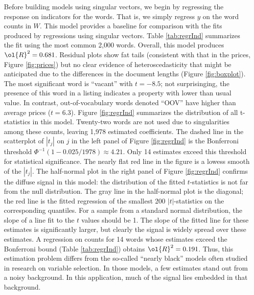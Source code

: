 \documentclass[12pt]{article}
\begin{document}
Before building models using singular vectors, we begin by regressing the response on indicators for the words.  That is, we simply regress $y$ on the word counts in $W$.  This model provides a baseline for comparison with the fits produced by regressions using singular vectors.  Table \ref{tab:regrInd} summarizes the fit using the most common 2,000 words.  Overall, this model produces $\ol{R}^2 = 0.681$.  Residual plots show fat tails (consistent with that in the prices, Figure \ref{fig:prices}) but no clear evidence of heteroscedasticity that might be anticipated due to the differences in the document lengths (Figure \ref{fig:boxplot}).  The most significant word is ``vacant'' with $t=-8.5$; not surprisinging, the presence of this word in a listing indicates a property with lower than usual value.  In contrast, out-of-vocabulary words denoted ``OOV'' have higher than average prices ($t=6.3$). Figure \ref{fig:regrInd} summarizes the distribution of all t-statistics in this model.  Twenty-two words are not used due to singularities among these counts, leaving 1,978 estimated coefficients.  The dashed line in the scatterplot of $|t_j|$ on $j$ in the left panel of Figure \ref{fig:regrInd} is the Bonferroni threshold $\Phi^{-1}(1-0.025/1978) \approx 4.21$.  Only 14 estimates exceed this threshold for statistical significance.  The nearly flat red line in the figure is a lowess smooth of the $|t_j|$.  The half-normal plot in the right panel of Figure \ref{fig:regrInd} confirms the diffuse signal in this model: the distribution of the fitted $t$-statistics is not far from the null distribution.  The gray line in the half-normal plot is the diagonal; the red line is the fitted regression of the smallest 200  $|t|$-statistics on the corresponding quantiles.  For a sample from a standard normal distribution, the slope of a line fit to the $t$ values should be 1.  The slope of the fitted line for these estimates is significantly larger, but clearly the signal is widely spread over these estimates.  A regression on counts for 14 words whose estimates exceed the Bonferroni bound (Table \ref{tab:regrInd}) obtains $\ol{R}^2 = 0.191$.  Thus, this estimation problem differs from the so-called ``nearly black'' models often studied in research on variable selection.  In those models, a few estimates stand out from a noisy background. In this application, much of the signal lies embedded in that background.
\end{document}
